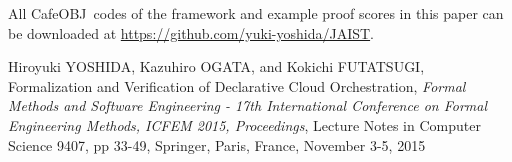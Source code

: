 \documentclass[12pt]{report}
\newcommand{\cafeobj}{{\sf CafeOBJ}~}
\begin{document}
All \cafeobj codes of the framework and example proof scores in this paper
can be downloaded at \url{https://github.com/yuki-yoshida/JAIST}.

\appendix




\begin{publication}

\item
Hiroyuki YOSHIDA, Kazuhiro OGATA, and Kokichi FUTATSUGI,
Formalization and Verification of Declarative Cloud Orchestration,
\emph{Formal Methods and Software Engineering - 17th International Conference
               on Formal Engineering Methods, {ICFEM} 2015, Proceedings}, 
Lecture Notes in Computer Science 9407,
pp 33-49, 
Springer,
Paris, France,
November 3-5, 2015

\end{publication}
\end{document}
